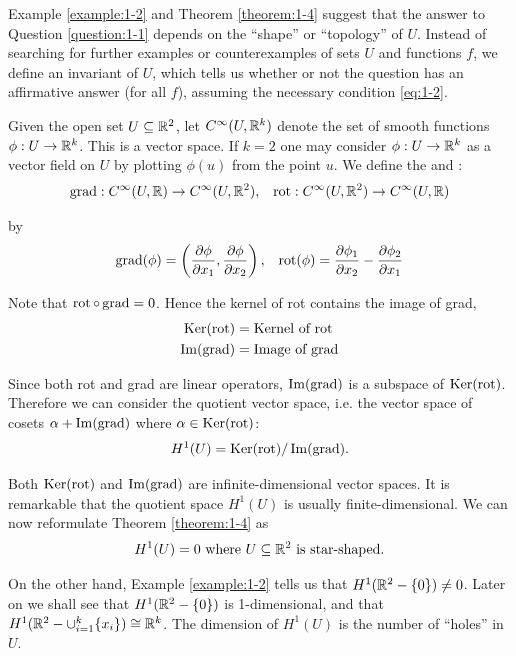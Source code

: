 Example \ref{example:1-2} and Theorem \ref{theorem:1-4} suggest that the answer to Question \ref{question:1-1} depends on the ``shape'' or
``topology'' of $U$. Instead of searching for further examples or counterexamples of sets $U$ and functions $f$, we
define an invariant of $U$, which tells us whether or not the question has an affirmative answer (for all $f$), assuming the 
necessary condition \eqref{eq:1-2}.

Given the open set $U\subseteq {\ensuremath{\mathbb{R}}}^2$, let $C^\infty(U, {\mathbb{R}}^k)$ denote the set of smooth functions $\phi:U\to{\ensuremath{\mathbb{R}}}^k$. This 
is a vector space. If $k=2$ one may consider $\phi:U\to{\ensuremath{\mathbb{R}}}^k$ as a vector field on $U$ by plotting $\phi(u)$ from the
point $u$. We define the  and :
\begin{align*}
  \operatorname{grad}: C^\infty(U, {\mathbb{R}}) \to C^\infty(U, {\mathbb{R}}^2), &&
  \operatorname{rot}: C^\infty(U, {\mathbb{R}}^2) \to C^\infty(U, {\mathbb{R}}) 
\end{align*}

by 
\begin{align*}
  \operatorname{grad}(\phi) = \left(\frac{\partial \phi}{\partial x_1}, \frac{\partial \phi}{\partial x_2}\right), &&
  \operatorname{rot}(\phi) = \frac{\partial \phi_1}{\partial x_2} - \frac{\partial \phi_2}{\partial x_1}
\end{align*}

Note that $\operatorname{rot}\circ \operatorname{grad} = 0$. Hence the kernel of rot contains the image of grad,
\begin{align*}
  \operatorname{Ker}(\operatorname{rot})  & = \text{Kernel of rot} \\
  \operatorname{Im}(\operatorname{grad})  & = \text{Image of grad}
\end{align*}

Since both rot and grad are linear operators, $\operatorname{Im}(\operatorname{grad})$ is a subspace of $\operatorname{Ker}(\operatorname{rot})$.
Therefore we can consider the quotient vector space, i.e. the vector space of
cosets $\alpha + \operatorname{Im}(\operatorname{grad})$ where $\alpha\in\operatorname{Ker}(\operatorname{rot})$:
\begin{align}\label{eq:1-3}
  H^1(U) = \operatorname{Ker}(\operatorname{rot})/\operatorname{Im}(\operatorname{grad}).
\end{align}

Both $\operatorname{Ker}(\operatorname{rot})$ and $\operatorname{Im}(\operatorname{grad})$ are infinite-dimensional vector spaces. It is remarkable 
that the quotient space $H^1(U)$ is usually finite-dimensional. We can now reformulate 
Theorem \ref{theorem:1-4} as
\begin{align}\label{eq:1-4}
  H^1(U) = 0 \text{ where } U\subseteq {\ensuremath{\mathbb{R}}}^2 \text{ is star-shaped}.
\end{align}

On the other hand, Example \ref{example:1-2} tells us that $H^1({\mathbb{R}}^2 - \{0\})\neq 0$. Later on we shall
see that $H^1({\mathbb{R}}^2 - \{0\})$ is 1-dimensional, and that $H^1({\mathbb{R}}^2 - \cup_{i=1}^k\{x_i\}) \cong {\ensuremath{\mathbb{R}}}^k$. 
The dimension of $H^1(U)$ is the number of ``holes'' in $U$.

